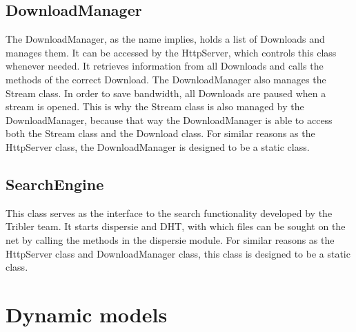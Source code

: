 \subsection{DownloadManager}
The DownloadManager, as the name implies, holds a list of Downloads and manages them. It can be accessed by the HttpServer, which controls this class whenever needed.
It retrieves information from all Downloads and calls the methods of the correct Download. The DownloadManager also manages the Stream class.
In order to save bandwidth, all Downloads are paused when a stream is opened. This is why the Stream class is also managed by the DownloadManager,
 because that way the DownloadManager is able to access both the Stream class and the Download class. For similar reasons as the HttpServer class, 
 the DownloadManager is designed to be a static class.

\subsection{SearchEngine}
This class serves as the interface to the search functionality developed by the Tribler team. It starts dispersie and DHT,
with which files can be sought on the net by calling the methods in the dispersie module. For similar reasons as the HttpServer class and DownloadManager class, 
this class is designed to be a static class.

\section{Dynamic models}

